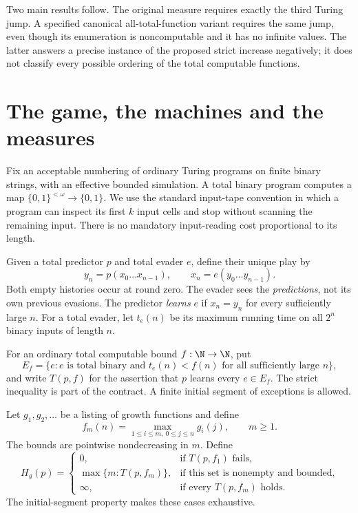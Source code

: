 \documentclass[11pt]{article}
\begin{document}
Two main results follow. The original measure requires exactly the
third Turing jump. A specified canonical all-total-function variant
requires the same jump, even though its enumeration is noncomputable
and it has no infinite values. The latter answers a precise instance
of the proposed strict increase negatively; it does not classify
every possible ordering of the total computable functions.

\section{The game, the machines and the measures}

Fix an acceptable numbering of ordinary Turing programs on finite
binary strings, with an effective bounded simulation. A total binary
program computes a map $\{0,1\}^{<\omega}\to\{0,1\}$. We use the
standard input-tape convention in which a program can inspect its
first $k$ input cells and stop without scanning the remaining input.
There is no mandatory input-reading cost proportional to its length.

Given a total predictor $p$ and total evader $e$, define their unique
play by
\[
 y_n=p(x_0\ldots x_{n-1}),\qquad
 x_n=e(y_0\ldots y_{n-1}).
\]
Both empty histories occur at round zero. The evader sees the
\emph{predictions}, not its own previous evasions. The predictor
\emph{learns} $e$ if $x_n=y_n$ for every sufficiently large $n$.
For a total evader, let $t_e(n)$ be its maximum running time on all
$2^n$ binary inputs of length $n$.

For an ordinary total computable bound $f:\N\to\N$, put
\[
 E_f=\{e:e\text{ is total binary and }t_e(n)<f(n)
                    \text{ for all sufficiently large }n\},
\]
and write $T(p,f)$ for the assertion that $p$ learns every $e\in E_f$.
The strict inequality is part of the contract. A finite initial segment
of exceptions is allowed.

Let $g_1,g_2,\ldots$ be a listing of growth functions and define
\begin{equation}\label{eq:bounds}
 f_m(n)=\max_{1\le i\le m,\ 0\le j\le n}g_i(j),\qquad m\ge1.
\end{equation}
The bounds are pointwise nondecreasing in $m$. Define
\[
 H_g(p)=
 \begin{cases}
 0,&\text{if }T(p,f_1)\text{ fails},\\
 \max\{m:T(p,f_m)\},&\text{if this set is nonempty and bounded},\\
 \infty,&\text{if every }T(p,f_m)\text{ holds}.
 \end{cases}
\]
The initial-segment property makes these cases exhaustive.
\end{document}

